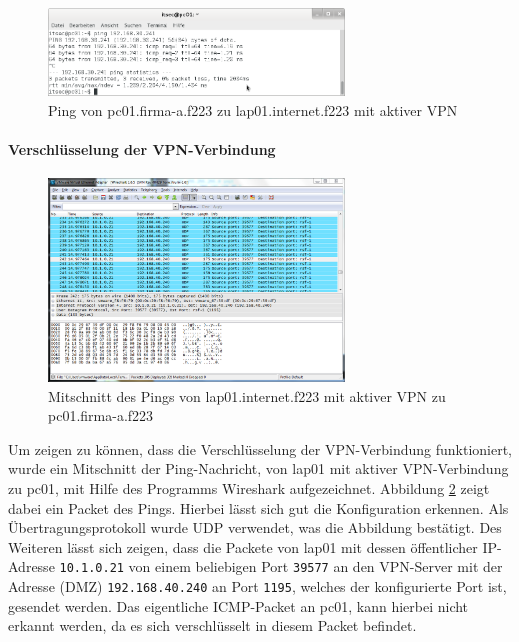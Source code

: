 \begin{figure}[h!]
  \centering
    \includegraphics[width=0.7\textwidth]{figures/vpn_pc01_ping_lap01.png}
  \caption{Ping von pc01.firma-a.f223 zu lap01.internet.f223 mit aktiver VPN}
  \label{vpn:pc01-ping-lap01}
\end{figure}

\paragraph{Verschlüsselung der VPN-Verbindung}

\begin{figure}[h!]
  \centering
    \includegraphics[width=0.7\textwidth]{figures/vpn_ws_lap01_ping_pc01.png}
  \caption{Mitschnitt des Pings von lap01.internet.f223 mit aktiver VPN zu pc01.firma-a.f223}
  \label{vpn:ws_lap01-ping-pc01}
\end{figure}


Um zeigen zu können, dass die Verschlüsselung der VPN-Verbindung funktioniert, wurde ein Mitschnitt der Ping-Nachricht, von lap01 mit aktiver VPN-Verbindung zu pc01, mit Hilfe des Programms Wireshark aufgezeichnet.
Abbildung \ref{vpn:ws_lap01-ping-pc01} zeigt dabei ein Packet des Pings. Hierbei lässt sich gut die Konfiguration erkennen. Als Übertragungsprotokoll wurde UDP verwendet, was die Abbildung bestätigt. Des Weiteren lässt sich zeigen, dass die Packete von lap01 mit dessen öffentlicher IP-Adresse \texttt{10.1.0.21} von einem beliebigen Port \texttt{39577} an den VPN-Server mit der Adresse (DMZ) \texttt{192.168.40.240} an Port \texttt{1195}, welches der konfigurierte Port ist, gesendet werden. Das eigentliche ICMP-Packet an pc01, kann hierbei nicht erkannt werden, da es sich verschlüsselt in diesem Packet befindet.

